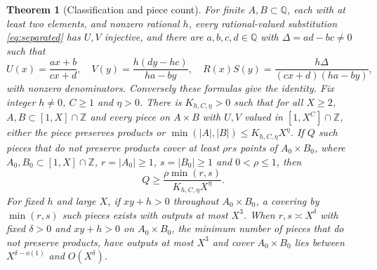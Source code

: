 \documentclass[11pt]{article}
\newtheorem{theorem}{Theorem}[section]
\theoremstyle{definition}
\newcommand{\Z}{\mathbb Z}
\theoremstyle{remark}
\numberwithin{equation}{section}
\newcommand{\Q}{\mathbb Q}
\begin{document}
\begin{theorem}[Classification and piece count]\label{thm:pieces}
For finite $A,B\subset\Q$, each with at least two elements, and nonzero rational $h$, every rational-valued
substitution \eqref{eq:separated} has $U,V$ injective, and there are $a,b,c,d\in\Q$ with $\Delta=ad-bc\ne0$ such that
\begin{equation}\label{eq:moebius}
 U(x)=\frac{ax+b}{cx+d},\quad V(y)=\frac{h(dy-hc)}{ha-by},\quad
 R(x)S(y)=\frac{h\Delta}{(cx+d)(ha-by)},
\end{equation}
with nonzero denominators. Conversely these formulas give the identity.
Fix integer $h\ne0$, $C\ge1$ and $\eta>0$. There is $K_{h,C,\eta}>0$ such that for all $X\ge2$,
$A,B\subset[1,X]\cap\Z$ and every piece on $A\times B$ with $U,V$ valued in $[1,X^C]\cap\Z$, either the piece
preserves products or $\min(|A|,|B|)\le K_{h,C,\eta}X^\eta$.
If $Q$ such pieces that do not preserve products cover at least $\rho rs$ points of
$A_0\times B_0$, where $A_0,B_0\subset[1,X]\cap\Z$, $r=|A_0|\ge1$, $s=|B_0|\ge1$ and $0<\rho\le1$, then
\begin{equation}\label{eq:piece-count}
 Q\ge\frac{\rho\min(r,s)}{K_{h,C,\eta}X^\eta}.
\end{equation}
For fixed $h$ and large $X$, if $xy+h>0$ throughout $A_0\times B_0$, a covering by
$\min(r,s)$ such pieces exists with outputs at most $X^3$.
When $r,s\asymp X^\delta$ with fixed $\delta>0$ and $xy+h>0$ on $A_0\times B_0$, the minimum number of pieces
that do not preserve products, have outputs at most $X^3$ and cover $A_0\times B_0$ lies between
$X^{\delta-o(1)}$ and $O(X^\delta)$.
\end{theorem}
\end{document}
